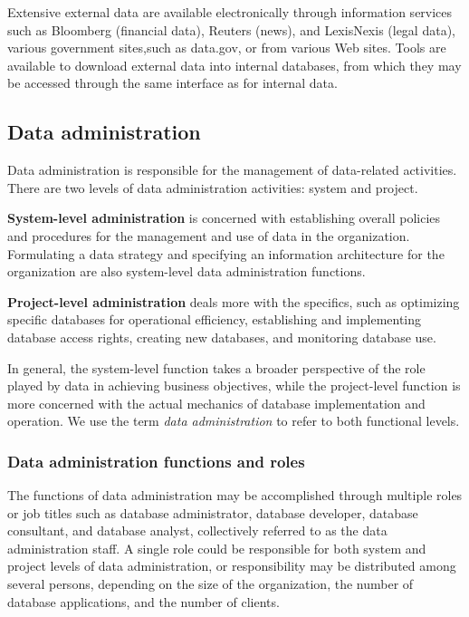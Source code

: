 \documentclass[
]{article}
\begin{document}
Extensive external data are available electronically through information
services such as Bloomberg (financial data), Reuters (news), and
LexisNexis (legal data), various government sites,such as data.gov, or
from various Web sites. Tools are available to download external data
into internal databases, from which they may be accessed through the
same interface as for internal data.

\hypertarget{data-administration-1}{%
\subsection*{Data administration}\label{data-administration-1}}

Data administration is responsible for the management of data-related
activities. There are two levels of data administration activities:
system and project.

\textbf{System-level administration} is concerned with establishing overall
policies and procedures for the management and use of data in the
organization. Formulating a data strategy and specifying an information
architecture for the organization are also system-level data
administration functions.

\textbf{Project-level administration} deals more with the specifics, such as
optimizing specific databases for operational efficiency, establishing
and implementing database access rights, creating new databases, and
monitoring database use.

In general, the system-level function takes a broader perspective of the
role played by data in achieving business objectives, while the
project-level function is more concerned with the actual mechanics of
database implementation and operation. We use the term \emph{data
administration} to refer to both functional levels.

\hypertarget{data-administration-functions-and-roles}{%
\subsubsection*{Data administration functions and roles}\label{data-administration-functions-and-roles}}

The functions of data administration may be accomplished through
multiple roles or job titles such as database administrator, database
developer, database consultant, and database analyst, collectively
referred to as the data administration staff. A single role could be
responsible for both system and project levels of data administration,
or responsibility may be distributed among several persons, depending on
the size of the organization, the number of database applications, and
the number of clients.
\end{document}
